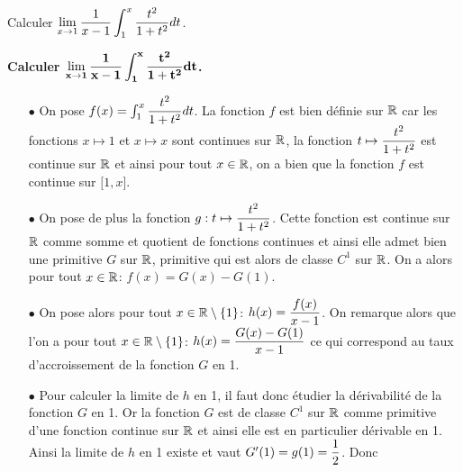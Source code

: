 \documentclass[a4paper, 11pt,reqno]{article}
\begin{document}
\begin{exercice}  \;
	Calculer $\lim\limits_{x\to 1} \displaystyle\frac{1}{x-1}\int_1^x \displaystyle\frac{t^2}{1+t^2}dt$.
\end{exercice}
\begin{correction}\;
	\noindent \textbf{Calculer $\mathbf{\lim\limits_{x\to 1} \displaystyle\frac{1}{x-1}\int_1^x \displaystyle\frac{t^2}{1+t^2}dt}$.}
	\begin{itemize}
		\item[$\bullet$] On pose $f(x)=\int_1^x \displaystyle\frac{t^2}{1+t^2} dt$. La fonction $f$ est bien d\'efinie sur $\mathbb{R}$ car les fonctions $x\mapsto 1$ et $x\mapsto x$ sont continues sur $\mathbb{R}$, la fonction $t\mapsto \displaystyle\frac{t^2}{1+t^2}$ est continue sur $\mathbb{R}$ et ainsi pour tout $x\in\mathbb{R}$, on a bien que la fonction $f$ est continue sur $\lbrack 1,x\rbrack$.
		\item[$\bullet$] On pose de plus la fonction $g: t\mapsto \displaystyle\frac{t^2}{1+t^2}$. Cette fonction est continue sur $\mathbb{R}$ comme somme et quotient de fonctions continues et ainsi elle admet bien une primitive $G$ sur $\mathbb{R}$, primitive qui est alors de classe $C^1$ sur $\mathbb{R}$. On a alors pour tout $x\in\mathbb{R}$: $f(x)=G(x)-G(1)$.
		\item[$\bullet$] On pose alors pour tout $x\in\mathbb{R}\setminus\lbrace 1\rbrace$: $h(x)=\displaystyle\frac{f(x)}{x-1}$. On remarque alors que l'on a pour tout $x\in\mathbb{R}\setminus\lbrace 1\rbrace$: $h(x)=\displaystyle\frac{G(x)-G(1)}{x-1}$ ce qui correspond au taux d'accroissement de la fonction $G$ en 1.
		\item[$\bullet$] Pour calculer la limite de $h$ en 1, il faut donc \'etudier la d\'erivabilit\'e de la fonction $G$ en 1. Or la fonction $G$ est de classe $C^1$ sur $\mathbb{R}$ comme primitive d'une fonction continue sur $\mathbb{R}$ et ainsi elle est en particulier d\'erivable en 1. Ainsi la limite de $h$ en 1 existe et vaut $G^{\prime}(1)=g(1)=\displaystyle\frac{1}{2}$. Donc 
	\end{itemize}
\end{correction}
\end{document}
